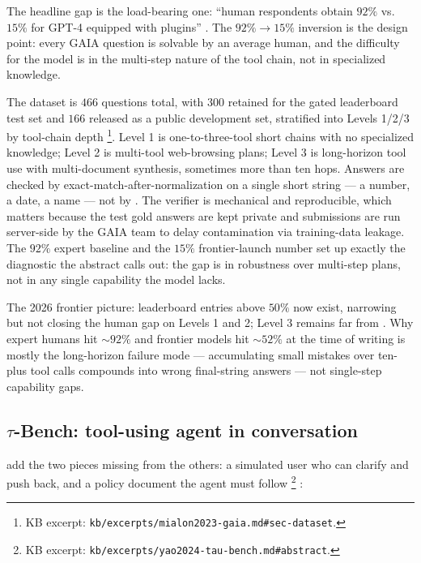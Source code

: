 The headline gap is the load-bearing one: ``human respondents obtain
$92\%$ vs.\ $15\%$ for GPT-4 equipped with plugins''
\citep[\S{}abstract]{mialon2023-gaia}. The $92\% \to 15\%$ inversion
is the design point: every GAIA question is solvable by an average
human, and the difficulty for the model is in the multi-step nature
of the tool chain, not in specialized knowledge.

The dataset is $466$ questions total, with $300$ retained for the
gated leaderboard test set and $166$ released as a public development
set, stratified into Levels 1/2/3 by tool-chain depth%
\footnote{KB excerpt: \texttt{kb/excerpts/mialon2023-gaia.md\#sec-dataset}.}.
Level 1 is one-to-three-tool short chains with no specialized
knowledge; Level 2 is multi-tool web-browsing plans; Level 3 is
long-horizon tool use with multi-document synthesis, sometimes more
than ten hops. Answers are checked by exact-match-after-normalization
on a single short string --- a number, a date, a name --- not by
. The verifier is mechanical and reproducible, which
matters because the test gold answers are kept private and submissions
are run server-side by the GAIA team to delay contamination via
training-data leakage. The $92\%$ expert baseline and the $15\%$
frontier-launch number set up exactly the diagnostic the abstract
calls out: the gap is in robustness over multi-step plans, not in
any single capability the model lacks.

The 2026 frontier picture: leaderboard entries above $50\%$ now exist,
narrowing but not closing the human gap on Levels 1 and 2; Level 3
remains far from . Why expert humans hit $\sim 92\%$ and
frontier models hit $\sim 52\%$ at the time of writing is mostly
the long-horizon failure mode --- accumulating small mistakes over
ten-plus tool calls compounds into wrong final-string answers --- not
single-step capability gaps.

\subsection{$\tau$-Bench: tool-using agent in conversation}
\label{sec:agentic-tau-bench}

\citet{yao2024-tau-bench} add the two pieces missing from the others:
a simulated user who can clarify and push back, and a policy document
the agent must follow%
\footnote{KB excerpt: \texttt{kb/excerpts/yao2024-tau-bench.md\#abstract}.}
\citep[\S{}abstract]{yao2024-tau-bench}:

